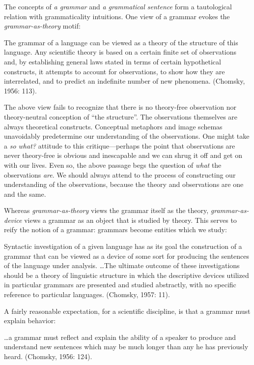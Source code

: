 The concepts of \textit{a grammar} and \textit{a grammatical sentence} form a tautological relation with grammaticality intuitions. One view of a grammar evokes the \textit{grammar-as-theory} motif:

The grammar of a language can be viewed as a theory of the structure of this language. Any scientific theory is based on a certain finite set of observations and, by establishing general laws stated in terms of certain hypothetical constructs, it attempts to account for observations, to show how they are interrelated, and to predict an indefinite number of new phenomena. (Chomsky, 1956: 113).

  The above view fails to recognize that there is no theory-free observation nor theory-neutral conception of “the structure”. The observations themselves are always theoretical constructs. Conceptual metaphors and image schemas unavoidably predetermine our understanding of the observations. One might take a \textit{so what?} attitude to this critique—perhaps the point that observations are never theory-free is obvious and inescapable and we can shrug it off and get on with our lives. Even so, the above passage begs the question of \textit{what} the observations \textit{are}. We should always attend to the process of constructing our understanding of the observations, because the theory and observations are one and the same.

  Whereas \textit{grammar-as-theory} views the grammar itself as the theory, \textit{grammar-as-device} views a grammar as an object that is studied by theory. This serves to reify the notion of a grammar: grammars become entities which we study:

Syntactic investigation of a given language has as its goal the construction of a grammar that can be viewed as a device of some sort for producing the sentences of the language under analysis. …The ultimate outcome of these investigations should be a theory of linguistic structure in which the descriptive devices utilized in particular grammars are presented and studied abstractly, with no specific reference to particular languages. (Chomsky, 1957: 11).

A fairly reasonable expectation, for a scientific discipline, is that a grammar must explain behavior:

…a grammar must reflect and explain the ability of a speaker to produce and understand new sentences which may be much longer than any he has previously heard. (Chomsky, 1956: 124).

